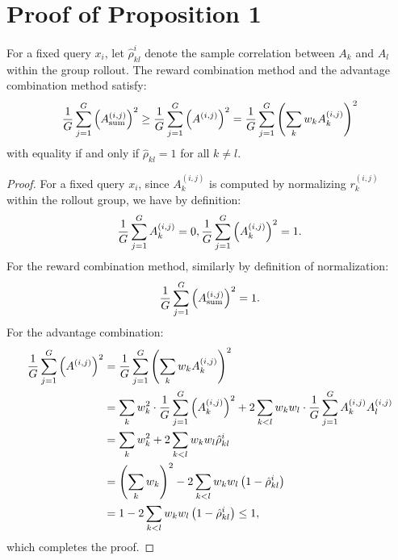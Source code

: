 \documentclass{llmxive}
\begin{document}
\appendix
{}

\section{Proof of Proposition 1}
\label{appendix:proof_of_proposition_1}

\begin{proposition}
    For a fixed query $x_i$, let $\hat{\rho}_{kl}^i$ denote the sample correlation between $A_k$ and $A_l$ within the group rollout. The reward combination method and the advantage combination method satisfy:
    \begin{align}
        \frac{1}{G} \sum_{j=1}^G \left(A_\text{sum}^{(i,j)}\right)^2 \ge \frac{1}{G} \sum_{j=1}^G \left(A^{(i,j)}\right)^2 = \frac{1}{G} \sum_{j=1}^G \left(\sum_k w_k A_k^{(i,j)}\right)^2 \notag
    \end{align}
    with equality if and only if $\hat{\rho}_{kl}=1$ for all $k \neq l$.
\end{proposition}
\begin{proof}
    For a fixed query $x_i$, since $A_k^{(i,j)}$ is computed by normalizing $r_k^{(i,j)}$ within the rollout group, we have by definition:
    \begin{align}
        \frac{1}{G}\sum_{j=1}^G A_k^{(i,j)} = 0, \frac{1}{G}\sum_{j=1}^G \left( A_k^{(i,j)} \right)^2 = 1.\notag
    \end{align}
    For the reward combination method, similarly by definition of normalization:
    \begin{align}
        \frac{1}{G} \sum_{j=1}^G \left( A_\text{sum}^{(i,j)} \right)^2 = 1.\notag
    \end{align}
    For the advantage combination:
    \begin{align}
        \frac{1}{G} \sum_{j=1}^G \left(A^{(i,j)}\right)^2 &= \frac{1}{G} \sum_{j=1}^G \left(\sum_k w_k A_k^{(i,j)}\right)^2 \notag\\
        &= \sum_k w_k^2 \cdot \frac{1}{G} \sum_{j=1}^G \left( A_k^{(i,j)} \right)^2 + 2 \sum_{k < l} w_k w_l \cdot \frac{1}{G} \sum_{j=1}^G A_k^{(i,j)}A_l^{(i,j)} \notag\\
        &= \sum_k w_k^2 + 2 \sum_{k<l} w_k w_l \hat{\rho}_{kl}^i \notag\\
        &= \left(\sum_k w_k\right)^2 - 2\sum_{k<l} w_k w_l \left(1 - \hat{\rho}_{kl}^i\right) \notag\\
        &= 1 - 2\sum_{k<l} w_k w_l \left(1 - \hat{\rho}_{kl}^i\right) \le 1, \notag
    \end{align}
    which completes the proof.
\end{proof}
\end{document}
